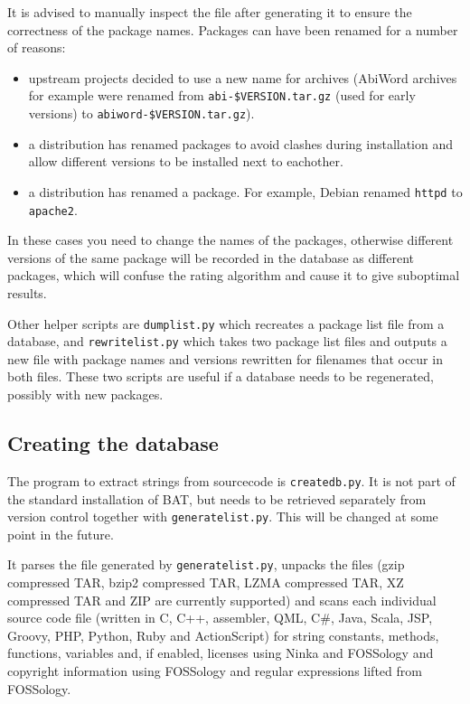 \documentclass[10pt,a4paper]{article}
\begin{document}
It is advised to manually inspect the file after generating it to ensure the
correctness of the package names. Packages can have been renamed for a number
of reasons:

\begin{itemize}
\item upstream projects decided to use a new name for archives (AbiWord
archives for example were renamed from \texttt{abi-\$VERSION.tar.gz} (used for
early versions) to \texttt{abiword-\$VERSION.tar.gz}).
\item a distribution has renamed packages to avoid clashes during installation
and allow different versions to be installed next to eachother.
\item a distribution has renamed a package. For example, Debian renamed
\texttt{httpd} to \texttt{apache2}.
\end{itemize}

In these cases you need to change the names of the packages, otherwise
different versions of the same package will be recorded in the database as
different packages, which will confuse the rating algorithm and cause it to
give suboptimal results.

Other helper scripts are \texttt{dumplist.py} which recreates a package list
file from a database, and \texttt{rewritelist.py} which takes two package list
files and outputs a new file with package names and versions rewritten for
filenames that occur in both files. These two scripts are useful if a database
needs to be regenerated, possibly with new packages.

\subsection{Creating the database}

The program to extract strings from sourcecode is \texttt{createdb.py}. It is
not part of the standard installation of BAT, but needs to be retrieved
separately from version control together with \texttt{generatelist.py}. This
will be changed at some point in the future.

It parses the file generated by \texttt{generatelist.py}, unpacks the files
(gzip compressed TAR, bzip2 compressed TAR, LZMA compressed TAR, XZ compressed
TAR and ZIP are currently supported) and scans each individual source code file
(written in C, C++, assembler, QML, C\#, Java, Scala, JSP, Groovy, PHP, Python,
Ruby and ActionScript) for string constants, methods, functions, variables and,
if enabled, licenses using Ninka and FOSSology and copyright information using
FOSSology and regular expressions lifted from FOSSology.
\end{document}
